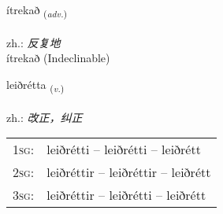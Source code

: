 \documentclass[frontgrid, backgrid]{flacards}\usepackage[]{graphicx}\usepackage[]{xcolor}
\begin{document}

\renewcommand{\flhead}{\vskip5pt \fboxsep=0pt {\small\bfseries\footnotesize Atviksorð | 副词}}
\renewcommand{\fcfoot}{\vskip5pt \fboxsep=0pt \hspace{2pt}{\small\bfseries\footnotesize 3K}}

\renewcommand{\blhead}{\vskip5pt {\small\bfseries\footnotesize Atviksorð | 副词 }}
\renewcommand{\bcfoot}{\vskip5pt \hspace{2pt}{\small\bfseries\footnotesize 3K}}


{ítrekað \small{\textsubscript{(\textit{adv.})}} \\[1ex]
\textphonetic{[iːtrɛkað]} \\
zh.: \emph{反复地} \\  [2ex]
ítrekað (Indeclinable)}

\renewcommand{\flhead}{\vskip5pt \fboxsep=0pt {\small\bfseries\footnotesize Nafnorð | 动词}}
\renewcommand{\fcfoot}{\vskip5pt \fboxsep=0pt \hspace{2pt}{\small\bfseries\footnotesize 3K}}

\renewcommand{\blhead}{\vskip5pt {\small\bfseries\footnotesize Nafnorð | 动词 }}
\renewcommand{\bcfoot}{\vskip5pt \hspace{2pt}{\small\bfseries\footnotesize 3K}}


{leiðrétta \small{\textsubscript{(\textit{v.})}} \\[1ex] %
\textphonetic{[leiðrjɛhta]} \\
zh.: \emph{改正，纠正} \\  [2ex]
\renewcommand*{\arraystretch}{0.8}
\begin{tabular}{p{1cm}l}
\textsc{1sg}: & leiðrétti -- leiðrétti -- leiðrétt \\ 
\textsc{2sg}: & leiðréttir -- leiðréttir -- leiðrétt \\ 
\textsc{3sg}: & leiðréttir -- leiðrétti -- leiðrétt \\ 
\end{tabular}
}
\end{document}
